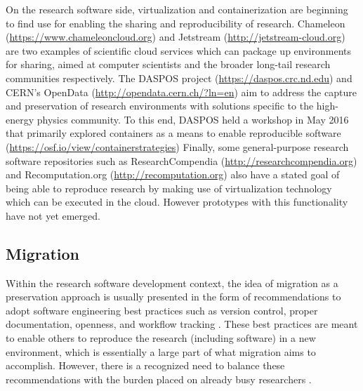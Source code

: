 \documentclass[letterpaper,11pt]{article}
\begin{document}
On the research software side, virtualization and containerization are beginning to find use for enabling the sharing and reproducibility of research. Chameleon (\url{https://www.chameleoncloud.org}) and Jetstream (\url{http://jetstream-cloud.org}) are two examples of scientific cloud services which can package up environments for sharing, aimed at computer scientists and the broader long-tail research communities respectively. The DASPOS project (\url{https://daspos.crc.nd.edu}) and CERN’s OpenData (\url{http://opendata.cern.ch/?ln=en}) aim to address the capture and preservation of research environments with solutions specific to the high-energy physics community. To this end, DASPOS held a workshop in May 2016 that primarily explored containers as a means to enable reproducible software (\url{https://osf.io/view/containerstrategies})  Finally, some general-purpose research software repositories such as ResearchCompendia (\url{http://researchcompendia.org}) and Recomputation.org (\url{http://recomputation.org}) also have a stated goal of being able to reproduce research by making use of virtualization technology which can be executed in the cloud. However prototypes with this functionality have not yet emerged.


\subsection{Migration}
Within the research software development context, the idea of migration as a preservation approach is usually presented in the form of recommendations to adopt software engineering best practices such as version control, proper documentation, openness, and workflow tracking \citep{stodden2014,lenhardt2014}. These best practices are meant to enable others to reproduce the research (including software) in a new environment, which is essentially a large part of what migration aims to accomplish. However, there is a recognized need to balance these recommendations with the burden placed on already busy researchers \citep{hong2014}.
\end{document}

